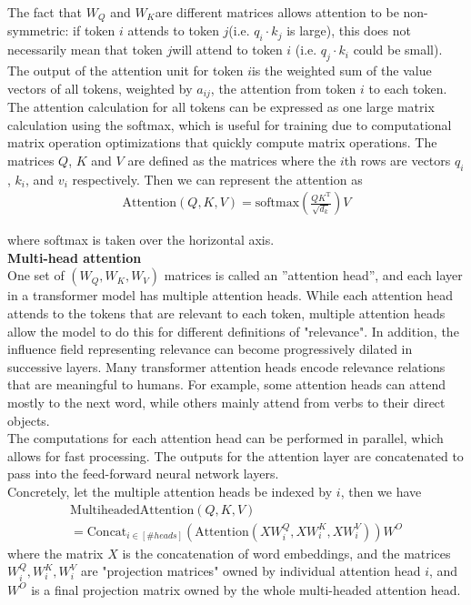 The fact that \(W_Q\) and \(W_K\)are different matrices allows attention to be non-symmetric: if token \(i\) attends to token  \(j\)(i.e.  \(q_i\cdot k_j\) is large), this does not necessarily mean that token  \(j\)will attend to token \(i\) (i.e. \(q_j\cdot k_i\) could be small). The output of the attention unit for token \(i\)is the weighted sum of the value vectors of all tokens, weighted by \(a_{ij}\), the attention from token \(i\) to each token.
\\

The attention calculation for all tokens can be expressed as one large matrix calculation using the softmax, which is useful for training due to computational matrix operation optimizations that quickly compute matrix operations. The matrices \(Q\), \(K\) and \(V\) are defined as the matrices where the \(i\)th rows are vectors \(q_i\), \(k_i\), and \(v_i\) respectively. Then we can represent the attention as
\begin{align}
\text{Attention}(Q, K, V) = \text{softmax}\left(\frac{QK^\mathrm{T}}{\sqrt{d_k}}\right)V
\end{align}

where softmax is taken over the horizontal axis.
\\

\textbf{Multi-head attention} \\
One set of \(\left( W_Q, W_K, W_V \right)\) matrices is called an ''attention head'', and each layer in a transformer model has multiple attention heads. While each attention head attends to the tokens that are relevant to each token, multiple attention heads allow the model to do this for different definitions of "relevance". In addition, the influence field representing relevance can become progressively dilated in successive layers. Many transformer attention heads encode relevance relations that are meaningful to humans. For example, some attention heads can attend mostly to the next word, while others mainly attend from verbs to their direct objects.
\\

The computations for each attention head can be performed in parallel, which allows for fast processing. The outputs for the attention layer are concatenated to pass into the feed-forward neural network layers.
\\

Concretely, let the multiple attention heads be indexed by \(i\), then we have
\begin{multline}
\text{MultiheadedAttention}(Q, K, V) \\ =  \text{Concat}_{i \in [\# heads]}(\text{Attention}(XW^Q_i, XW^K_i, XW^V_i)) W^O
\end{multline}
where the matrix \(X\) is the concatenation of word embeddings, and the matrices \(W^Q_i, W^K_i, W^V_i\) are "projection matrices" owned by individual attention head \(i\), and \(W^O\) is a final projection matrix owned by the whole multi-headed attention head.
\\

